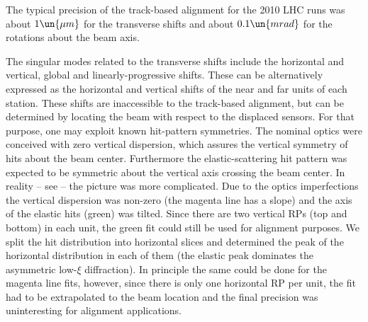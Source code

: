 
The typical precision of the track-based alignment for the 2010 LHC runs was about $1\un{\mu m}$ for the transverse shifts and about $0.1\un{mrad}$ for the rotations about the beam axis.


The singular modes related to the transverse shifts include the horizontal and vertical, global and linearly-progressive shifts. These can be alternatively expressed as the horizontal and vertical shifts of the near and far units of each station. These shifts are inaccessible to the track-based alignment, but can be determined by locating the beam with respect to the displaced sensors. For that purpose, one may exploit known hit-pattern symmetries. The nominal optics were conceived with zero vertical dispersion, which assures the vertical symmetry of hits about the beam center. Furthermore the elastic-scattering hit pattern was expected to be symmetric about the vertical axis crossing the beam center. In reality -- see  -- the picture was more complicated. Due to the optics imperfections the vertical dispersion was non-zero (the magenta line has a slope) and the axis of the elastic hits (green) was tilted. Since there are two vertical RPs (top and bottom) in each unit, the green fit could still be used for alignment purposes. We split the hit distribution into horizontal slices and determined the peak of the horizontal distribution in each of them (the elastic peak dominates the asymmetric low-$\xi$ diffraction). In principle the same could be done for the magenta line fits, however, since there is only one horizontal RP per unit, the fit had to be extrapolated to the beam location and the final precision was uninteresting for alignment applications.

